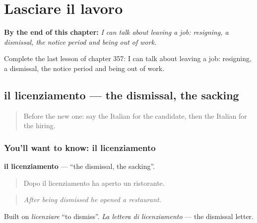 
\chapter{Lasciare il lavoro}
\label{ch:it-lasciare-il-lavoro}

\begin{chapteropening}
\textbf{By the end of this chapter:} \emph{I can talk about leaving a job: resigning, a dismissal, the notice period and being out of work.}

Complete the last lesson of chapter 357: I can talk about leaving a job: resigning, a dismissal, the notice period and being out of work.
\end{chapteropening}

\section[il licenziamento]{il licenziamento — the dismissal, the sacking}

\label{lesson:IT-C357-licenziamento}



\begin{quote}
Before the new one: say the Italian for the candidate, then the Italian for the hiring.
\end{quote}

\subsection*{You'll want to know: il licenziamento}
\textbf{il licenziamento} — \textquotedblleft{}the dismissal, the sacking\textquotedblright{}.

\begin{quote}
Dopo il licenziamento ha aperto un ristorante.
\end{quote}

\begin{quote}
\emph{After being dismissed he opened a restaurant.}
\end{quote}

Built on \emph{licenziare} \textquotedblleft{}to dismiss\textquotedblright{}. \emph{La lettera di licenziamento} — the dismissal letter.


